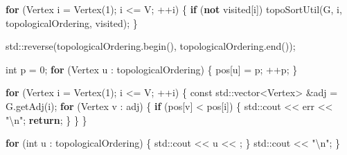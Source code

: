 \documentclass[
]{article}
\newenvironment{Shaded}{}{}
\newcommand{\AttributeTok}[1]{\textcolor[rgb]{0.49,0.56,0.16}{#1}}
\newcommand{\BuiltInTok}[1]{#1}
\newcommand{\CharTok}[1]{\textcolor[rgb]{0.25,0.44,0.63}{#1}}
\newcommand{\ControlFlowTok}[1]{\textcolor[rgb]{0.00,0.44,0.13}{\textbf{#1}}}
\newcommand{\DataTypeTok}[1]{\textcolor[rgb]{0.56,0.13,0.00}{#1}}
\newcommand{\DecValTok}[1]{\textcolor[rgb]{0.25,0.63,0.44}{#1}}
\newcommand{\KeywordTok}[1]{\textcolor[rgb]{0.00,0.44,0.13}{\textbf{#1}}}
\newcommand{\NormalTok}[1]{#1}
\newcommand{\SpecialCharTok}[1]{\textcolor[rgb]{0.25,0.44,0.63}{#1}}
\newcommand{\StringTok}[1]{\textcolor[rgb]{0.25,0.44,0.63}{#1}}
\begin{document}
\begin{Shaded}
\begin{Highlighting}[]
    \ControlFlowTok{for}\NormalTok{ (Vertex i = Vertex(}\DecValTok{1}\NormalTok{); i \textless{}= V; ++i) \{}
        \ControlFlowTok{if}\NormalTok{ (}\KeywordTok{not}\NormalTok{ visited[i]) }
\NormalTok{            topoSortUtil(G, i, topologicalOrdering, visited);}
\NormalTok{    \}}

    \BuiltInTok{std::}\NormalTok{reverse(topologicalOrdering.begin(), topologicalOrdering.end());}

    \DataTypeTok{int}\NormalTok{ p = }\DecValTok{0}\NormalTok{;}
    \ControlFlowTok{for}\NormalTok{ (Vertex u : topologicalOrdering) \{}
\NormalTok{        pos[u] = p; ++p;}
\NormalTok{    \}}

    \ControlFlowTok{for}\NormalTok{ (Vertex i = Vertex(}\DecValTok{1}\NormalTok{); i \textless{}= V; ++i) \{}
        \AttributeTok{const} \BuiltInTok{std::}\NormalTok{vector\textless{}Vertex\textgreater{} \&adj = G.getAdj(i);}
        \ControlFlowTok{for}\NormalTok{ (Vertex v : adj) \{}
            \ControlFlowTok{if}\NormalTok{ (pos[v] \textless{} pos[i]) \{}
                \BuiltInTok{std::}\NormalTok{cout \textless{}\textless{} err \textless{}\textless{} }\StringTok{"}\SpecialCharTok{\textbackslash{}n}\StringTok{"}\NormalTok{;}
                \ControlFlowTok{return}\NormalTok{; }
\NormalTok{            \}}
\NormalTok{        \}}
\NormalTok{    \}}

    \ControlFlowTok{for}\NormalTok{ (}\DataTypeTok{int}\NormalTok{ u : topologicalOrdering) \{}
        \BuiltInTok{std::}\NormalTok{cout \textless{}\textless{} u \textless{}\textless{} }\CharTok{\textquotesingle{} \textquotesingle{}}\NormalTok{;}
\NormalTok{    \}}
    \BuiltInTok{std::}\NormalTok{cout \textless{}\textless{} }\StringTok{"}\SpecialCharTok{\textbackslash{}n}\StringTok{"}\NormalTok{;}
\NormalTok{\}}
\end{Highlighting}
\end{Shaded}
\end{document}
